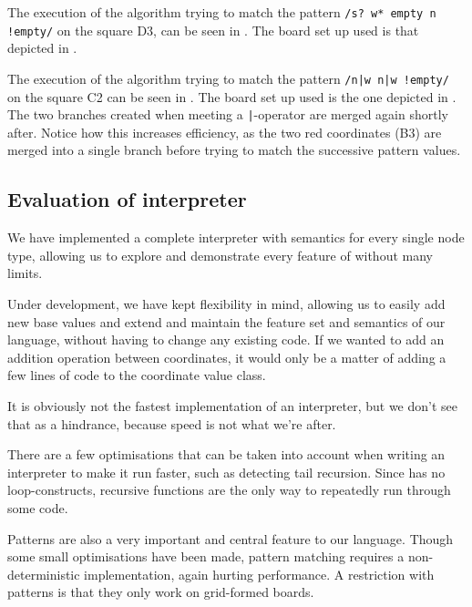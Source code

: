 
The execution of the algorithm trying to match the pattern \texttt{/s? w* empty
n !empty/} on the square D3, can be seen in . 
The board set up used is that depicted in .


The execution of the algorithm trying to match the pattern \texttt{/n|w n|w
!empty/} on the square C2 can be seen in . The board set up 
used is the one depicted in .
The two branches created when meeting a \texttt{|}-operator are merged again shortly after.
Notice how this increases efficiency, as the two red coordinates (B3) are merged
into a single branch before trying to match the successive pattern values.


\subsection{Evaluation of interpreter}
We have implemented a complete interpreter with semantics for every single node
type, allowing us to explore and demonstrate every feature of \productname{}
without many limits.

Under development, we have kept flexibility in mind, allowing us to easily add
new base values and extend and maintain the feature set and semantics of our
language, without having to change any existing code. If we wanted to add an
addition operation between coordinates, it would only be a matter of adding a few lines
of code to the coordinate value class.

It is obviously not the fastest implementation of an interpreter, but we don't
see that as a hindrance, because speed is not what we're after.

There are a few optimisations that can be taken into account when writing an
interpreter to make it run faster, such as detecting tail recursion. Since
\productname{} has no loop-constructs, recursive functions are the only way to
repeatedly run through some code.

Patterns are also a very important and central feature to our language. Though some 
small optimisations have been made, pattern matching requires a non-deterministic 
implementation, again hurting performance. A restriction with patterns is that they only work on
grid-formed boards.
